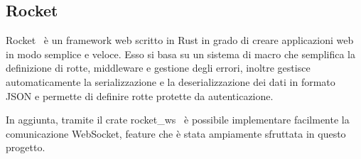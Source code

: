 \subsection{Rocket}

Rocket~\cite{rocketrs_website} è un framework web scritto in Rust in grado di creare applicazioni web in modo semplice e veloce.
Esso si basa su un sistema di macro che semplifica la definizione di rotte, middleware e gestione degli errori, 
inoltre gestisce automaticamente la serializzazione e la deserializzazione dei dati in formato JSON e permette di definire rotte
protette da autenticazione.

In aggiunta, tramite il crate rocket\_ws~\cite{rocket_ws} è possibile implementare facilmente la comunicazione WebSocket, feature 
che è stata ampiamente sfruttata in questo progetto.
